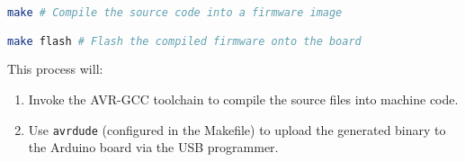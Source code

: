 \begin{lstlisting}[language=bash, caption={Using the Makefile to compile and upload firmware}, label={lst:arduino-makefile}]
make # Compile the source code into a firmware image

make flash # Flash the compiled firmware onto the board
\end{lstlisting}

This process will:
\begin{enumerate}
    \item Invoke the AVR-GCC toolchain to compile the source files into machine code.
    \item Use \texttt{avrdude} (configured in the Makefile) to upload the generated binary to the Arduino board via the USB programmer.
\end{enumerate}


